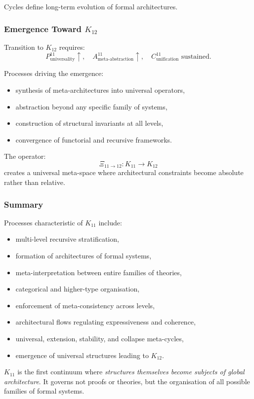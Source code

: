 Cycles define long-term evolution of formal architectures.

\subsubsection{Emergence Toward $K_{12}$}

Transition to $K_{12}$ requires:
\[
P^{11}_{\text{universality}} \uparrow,\quad
A^{11}_{\text{meta-abstraction}} \uparrow,\quad
C^{11}_{\text{unification}} \text{ sustained.}
\]

Processes driving the emergence:
\begin{itemize}
    \item synthesis of meta-architectures into universal operators,
    \item abstraction beyond any specific family of systems,
    \item construction of structural invariants at all levels,
    \item convergence of functorial and recursive frameworks.
\end{itemize}

The operator:
\[
\Xi_{11 \to 12} : K_{11} \rightarrow K_{12}
\]
creates a universal meta-space where architectural constraints 
become absolute rather than relative.

\subsubsection{Summary}

Processes characteristic of $K_{11}$ include:
\begin{itemize}
    \item multi-level recursive stratification,
    \item formation of architectures of formal systems,
    \item meta-interpretation between entire families of theories,
    \item categorical and higher-type organisation,
    \item enforcement of meta-consistency across levels,
    \item architectural flows regulating expressiveness and coherence,
    \item universal, extension, stability, and collapse meta-cycles,
    \item emergence of universal structures leading to $K_{12}$.
\end{itemize}

$K_{11}$ is the first continuum where \emph{structures themselves become subjects of global architecture}.  
It governs not proofs or theories, but the organisation of all possible families of formal systems.
